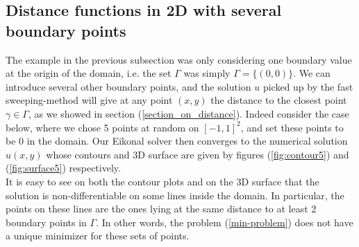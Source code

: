 \documentclass[11pt]{article}
\theoremstyle{definition}
\theoremstyle{remark}
\begin{document}
\subsection{Distance functions in 2D with several boundary points}
The example in the previous subsection was only considering one boundary value at the origin of the domain, i.e. the set $\Gamma$ was simply $\Gamma=\{(0,0)\}$. We can introduce several other boundary points, and the solution $u$ picked up by the fast sweeping-method will give at any point $(x,y)$ the distance to the closest point $\gamma\in\Gamma$, as we showed in section (\ref{section_on_distance}). Indeed consider the case below, where we chose 5 points at random on $[-1,1]^2$, and set these points to be 0 in the domain. Our Eikonal solver then converges to the numerical solution $u(x,y)$ whose contours and 3D surface are given by figures (\ref{fig:contour5}) and (\ref{fig:surface5}) respectively. \\
It is easy to see on both the contour plots and on the 3D surface that the solution is non-differentiable on some lines inside the domain. In particular, the points on these lines are the ones lying at the same distance to at least 2 boundary points in $\Gamma$. In other words, the problem (\ref{min-problem}) does not have a unique minimizer for these sets of points.

\vspace{5pt}
\end{document}
